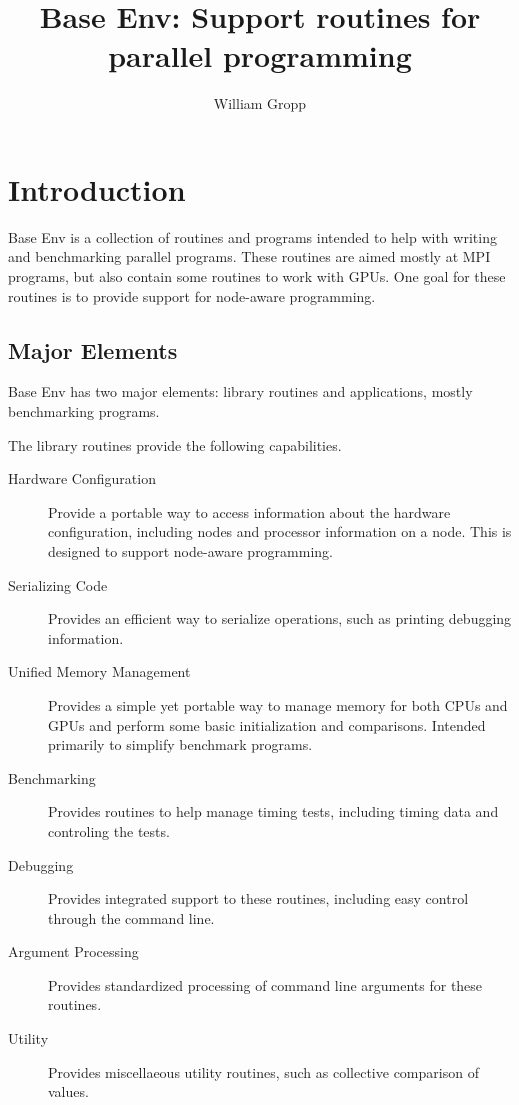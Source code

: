 \documentclass[11pt,letterpaper]{report}
\title{Base Env: Support routines for parallel programming}
\author{William Gropp}
\begin{document}
\maketitle

\chapter{Introduction}
Base Env is a collection of routines and programs intended to help
with writing and benchmarking parallel programs.
These routines are aimed mostly at MPI programs, but also contain some
routines to work with GPUs.
One goal for these routines is to provide support for node-aware
programming.

\section{Major Elements}
Base Env has two major elements: library routines and applications,
mostly benchmarking programs.

The library routines provide the following capabilities.
\begin{description}
\item[Hardware Configuration]Provide a portable way to access
  information about the hardware configuration, including nodes and
  processor information on a node. This is designed to support
  node-aware programming.
\item[Serializing Code]Provides an efficient way to serialize
  operations, such as printing debugging information.
\item[Unified Memory Management]Provides a simple yet portable way to
  manage memory for both CPUs and GPUs and perform some basic
  initialization and comparisons. Intended primarily to simplify
  benchmark programs.
\item[Benchmarking]Provides routines to help manage timing tests,
  including timing data and controling the tests.
\item[Debugging]Provides integrated support to these routines,
  including easy control through the command line.
\item[Argument Processing]Provides standardized processing of command
  line arguments for these routines.
\item[Utility]Provides miscellaeous utility routines, such as
  collective comparison of values.
\end{description}
\end{document}
